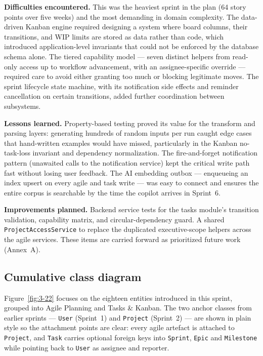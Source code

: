\textbf{Difficulties encountered.} This was the heaviest sprint in the plan (64 story points over
five weeks) and the most demanding in domain complexity. The data-driven Kanban engine required
designing a system where board columns, their transitions, and WIP limits are stored as data
rather than code, which introduced application-level invariants that could not be enforced by the
database schema alone. The tiered capability model --- seven distinct helpers from read-only
access up to workflow advancement, with an assignee-specific override --- required care to avoid
either granting too much or blocking legitimate moves. The sprint lifecycle state
machine, with its notification side effects and reminder cancellation on certain transitions,
added further coordination between subsystems.

\textbf{Lessons learned.} Property-based testing proved its value for the transform and parsing
layers: generating hundreds of random inputs per run caught edge cases that hand-written examples
would have missed, particularly in the Kanban no-task-loss invariant and dependency normalization.
The fire-and-forget notification pattern (unawaited calls to the notification service) kept the
critical write path fast without losing user feedback. The AI embedding outbox --- enqueueing
an index upsert on every agile and task write --- was easy to connect and ensures the
entire corpus is searchable by the time the copilot arrives in Sprint~6.

\textbf{Improvements planned.} Backend service tests for the tasks module's transition
validation, capability matrix, and circular-dependency guard. A shared
\texttt{ProjectAccessService} to replace the duplicated executive-scope helpers across the agile
services. These items are carried forward as prioritized future work (Annex~A).

\subsection{Cumulative class diagram}

Figure~\ref{fig:3-22} focuses on the eighteen entities introduced in this sprint, grouped into
Agile Planning and Tasks \& Kanban. The two anchor classes from earlier sprints ---
\texttt{User} (Sprint~1) and \texttt{Project} (Sprint~2) --- are shown in plain style so the
attachment points are clear: every agile artefact is attached to \texttt{Project}, and \texttt{Task}
carries optional foreign keys into \texttt{Sprint}, \texttt{Epic} and \texttt{Milestone} while
pointing back to \texttt{User} as assignee and reporter.

